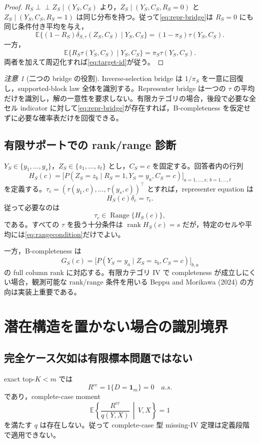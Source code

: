 \documentclass[11pt,a4paper]{ltjsarticle}
\theoremstyle{remark}\newtheorem{remark}{注意}[section]
\newcommand{\E}{\mathbb E}
\newcommand{\ind}{\perp\!\!\!\perp}
\newcommand{\rank}{\operatorname{rank}}
\newcommand{\Range}{\operatorname{Range}}
\newcommand{\given}{\,\middle|\,}
\newcommand{\one}{\bm 1}
\begin{document}
\begin{proof}
$R_S\ind Z_S\mid(Y_S,C_S)$ より，$Z_S\mid(Y_S,C_S,R_S=0)$ と $Z_S\mid(Y_S,C_S,R_S=1)$ は同じ分布を持つ。従って\eqref{eq:repr-bridge}は $R_S=0$ にも同じ条件付き平均を与え，
\[
\E\{(1-R_S)\delta_{S,\tau}(Z_S,C_S)\mid Y_S,C_S\}
=(1-\pi_S)\tau(Y_S,C_S).
\]
一方，
\[
\E\{R_S\tau(Y_S,C_S)\mid Y_S,C_S\}=\pi_S\tau(Y_S,C_S).
\]
両者を加えて周辺化すれば\eqref{eq:target-id}が従う。
\end{proof}

\begin{remark}[二つの bridge の役割]
Inverse-selection bridge は $1/\pi_S$ を一意に回復し，supported-block law 全体を識別する。Representer bridge は一つの $\tau$ の平均だけを識別し，解の一意性を要求しない。有限カテゴリの場合，後段で必要な全セル indicator に対して\eqref{eq:repr-bridge}が存在すれば，B-completeness を仮定せずに必要な確率表だけを回復できる。
\end{remark}

\subsection{有限サポートでの rank/range 診断}
$Y_S\in\{y_1,\ldots,y_s\}$，$Z_S\in\{z_1,\ldots,z_t\}$ とし，$C_S=c$ を固定する。回答者内の行列
\[
H_S(c)=\big[P(Z_S=z_b\mid R_S=1,Y_S=y_a,C_S=c)\big]_{a=1,\ldots,s;\ b=1,\ldots,t}
\]
を定義する。$\tau_c=(\tau(y_1,c),\ldots,\tau(y_s,c))^\top$ とすれば，representer equation は
\[
H_S(c)\delta_c=\tau_c.
\]
従って必要なのは
\begin{equation}
\tau_c\in\Range\{H_S(c)\},\label{eq:rangecondition}
\end{equation}
である。すべての $\tau$ を扱う十分条件は $\rank H_S(c)=s$ だが，特定のセルや平均には\eqref{eq:rangecondition}だけでよい。

一方，B-completeness は
\[
G_S(c)=\big[P(Y_S=y_a\mid Z_S=z_b,C_S=c)\big]_{b,a}
\]
の full column rank に対応する。有限カテゴリ IV で completeness が成立しにくい場合，観測可能な rank/range 条件を用いる Beppu and Morikawa (2024) の方向は実装上重要である。

\section{潜在構造を置かない場合の識別境界}

\subsection{完全ケース欠如は有限標本問題ではない}
exact top-$K<m$ では
\[
R^{cc}=1\{D=\one_m\}=0\quad a.s.
\]
であり，complete-case moment
\[
\E\left\{\frac{R^{cc}}{q(Y,X)}\given V,X\right\}=1
\]
を満たす $q$ は存在しない。従って complete-case 型 missing-IV 定理は定義段階で適用できない。
\end{document}

